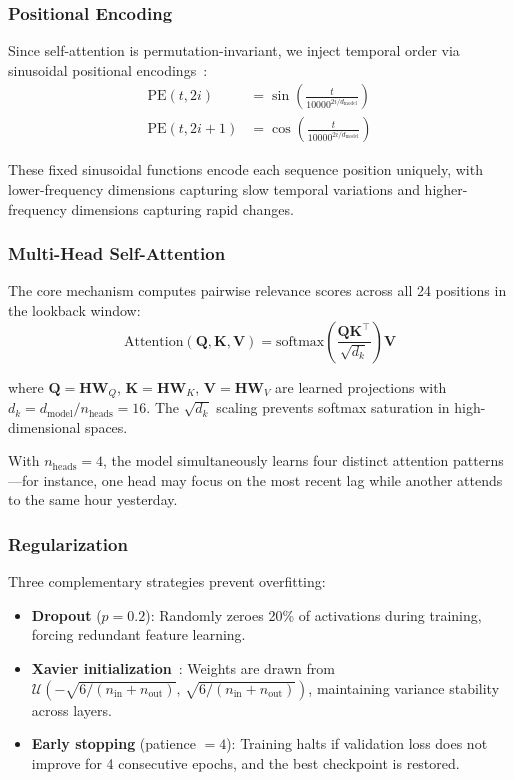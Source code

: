 \documentclass[conference, 10pt]{IEEEtran}
\begin{document}
\subsubsection{Positional Encoding}
Since self-attention is permutation-invariant, we inject temporal order via sinusoidal positional encodings~\cite{vaswani2017attention}:
\begin{align}
\text{PE}(t, 2i) &= \sin\!\left(\frac{t}{10000^{2i/d_\text{model}}}\right) \\
\text{PE}(t, 2i+1) &= \cos\!\left(\frac{t}{10000^{2i/d_\text{model}}}\right)
\end{align}

These fixed sinusoidal functions encode each sequence position uniquely, with lower-frequency dimensions capturing slow temporal variations and higher-frequency dimensions capturing rapid changes.

\subsubsection{Multi-Head Self-Attention}
The core mechanism computes pairwise relevance scores across all 24 positions in the lookback window:
\begin{equation}
\text{Attention}(\mathbf{Q}, \mathbf{K}, \mathbf{V}) = \text{softmax}\!\left(\frac{\mathbf{Q}\mathbf{K}^\top}{\sqrt{d_k}}\right) \mathbf{V}
\label{eq:attention}
\end{equation}

where $\mathbf{Q} = \mathbf{H}\mathbf{W}_Q$, $\mathbf{K} = \mathbf{H}\mathbf{W}_K$, $\mathbf{V} = \mathbf{H}\mathbf{W}_V$ are learned projections with $d_k = d_\text{model} / n_\text{heads} = 16$. The $\sqrt{d_k}$ scaling prevents softmax saturation in high-dimensional spaces.

With $n_\text{heads} = 4$, the model simultaneously learns four distinct attention patterns---for instance, one head may focus on the most recent lag while another attends to the same hour yesterday.

\subsubsection{Regularization}
Three complementary strategies prevent overfitting:
\begin{itemize}
    \item \textbf{Dropout} ($p = 0.2$): Randomly zeroes 20\% of activations during training, forcing redundant feature learning.
    \item \textbf{Xavier initialization}~\cite{glorot2010understanding}: Weights are drawn from $\mathcal{U}\!\left(-\sqrt{6/(n_\text{in}+n_\text{out})},\, \sqrt{6/(n_\text{in}+n_\text{out})}\right)$, maintaining variance stability across layers.
    \item \textbf{Early stopping} (patience $= 4$): Training halts if validation loss does not improve for 4 consecutive epochs, and the best checkpoint is restored.
\end{itemize}
\end{document}

